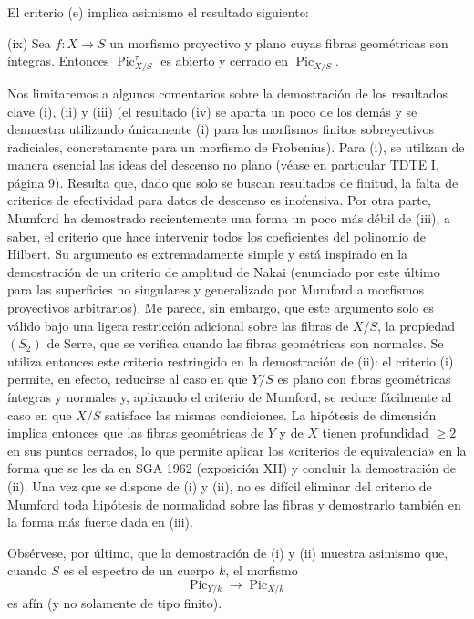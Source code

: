 El criterio (e) implica asimismo el resultado siguiente:

\medskip
\noindent(ix) Sea $f:X\longrightarrow S$ un morfismo proyectivo y plano cuyas
fibras geométricas son íntegras. Entonces $\operatorname{Pic}_{X/S}^\tau$ es
abierto y cerrado en $\operatorname{Pic}_{X/S}$.

Nos limitaremos a algunos comentarios sobre la demostración de los resultados
clave (i), (ii) y (iii) (el resultado (iv) se aparta un poco de los demás y se
demuestra utilizando únicamente (i) para los morfismos finitos sobreyectivos
radiciales, concretamente para un morfismo de Frobenius). Para (i), se
utilizan de manera esencial las ideas del descenso no plano (véase en
particular TDTE I, página 9). Resulta que, dado que solo se buscan resultados
de finitud, la falta de criterios de efectividad para datos de descenso es
inofensiva. Por otra parte, Mumford ha demostrado recientemente una forma un
poco más débil de (iii), a saber, el criterio que hace intervenir todos los
coeficientes del polinomio de Hilbert. Su argumento es extremadamente simple
y está inspirado en la demostración de un criterio de amplitud de Nakai
(enunciado por este último para las superficies no singulares y generalizado
por Mumford a morfismos proyectivos arbitrarios). Me parece, sin embargo, que
este argumento solo es válido bajo una ligera restricción adicional sobre las
fibras de $X/S$, la propiedad $(S_2)$ de Serre, que se verifica cuando las
fibras geométricas son normales. Se utiliza entonces este criterio restringido
en la demostración de (ii): el criterio (i) permite, en efecto, reducirse al
caso en que $Y/S$ es plano con fibras geométricas íntegras y normales y,
aplicando el criterio de Mumford, se reduce fácilmente al caso en que $X/S$
satisface las mismas condiciones. La hipótesis de dimensión implica entonces
que las fibras geométricas de $Y$ y de $X$ tienen profundidad $\geq2$ en sus
puntos cerrados, lo que permite aplicar los «criterios de equivalencia» en la
forma que se les da en SGA 1962 (exposición XII) y concluir la demostración de
(ii). Una vez que se dispone de (i) y (ii), no es difícil eliminar del criterio
de Mumford toda hipótesis de normalidad sobre las fibras y demostrarlo también
en la forma más fuerte dada en (iii).

Obsérvese, por último, que la demostración de (i) y (ii) muestra asimismo que,
cuando $S$ es el espectro de un cuerpo $k$, el morfismo
\[
\operatorname{Pic}_{Y/k}\longrightarrow\operatorname{Pic}_{X/k}
\]
es afín (y no solamente de tipo finito).
